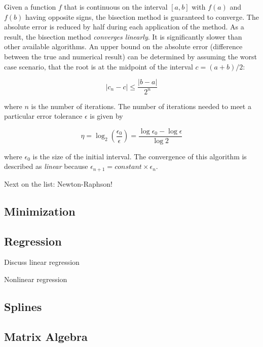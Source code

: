 Given a function $f$ that is continuous on the interval $[a,b]$ with $f(a)$ and $f(b)$ having opposite signs, the bisection method is guaranteed to converge. The absolute error is reduced by half during each application of the method. As a result, the bisection method \textit{converges linearly}. It is significantly slower than other available algorithms. An upper bound on the absolute error (difference between the true and numerical result) can be determined by assuming the worst case scenario, that the root is at the midpoint of the interval $c = (a+b)/2$:

\begin{equation}
|c_{n} - c| \le \frac{|b-a|}{2^{n}}
\end{equation}

where $n$ is the number of iterations. The number of iterations needed to meet a particular error tolerance $\epsilon$ is given by

\begin{equation}
\eta = \log_{2} (\frac{\epsilon_{0}}{\epsilon}) = \frac{\log \epsilon_{0} - \log \epsilon}{\log 2}
\end{equation}

where $\epsilon_{0}$ is the size of the initial interval. The convergence of this algorithm is described as \textit{linear} because $\epsilon_{n+1} = constant \times \epsilon_{n}$. 

Next on the list: Newton-Raphson!

\subsection{Minimization}

\subsection{Regression}

Discuss linear regression

Nonlinear regression

\subsection{Splines}

\subsection{Matrix Algebra}

